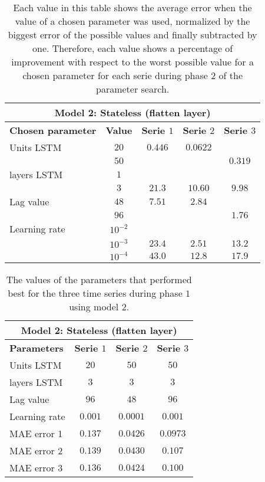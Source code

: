 \begin{table}[ht]
	\centering
	\begin{tabular}{@{}l||c|ccc@{}} \toprule
		\multicolumn{5}{c}{Model 2: Stateless (flatten layer)}\\\midrule\midrule
		\textbf{Chosen parameter}	& \textbf{Value} & \textbf{Serie $ 1 $} & \textbf{Serie $ 2 $} & \textbf{Serie $ 3 $}\\\midrule
		Units LSTM & $ 20 $ & $0.446 $&$ 0.0622 $  & \\
				   & $ 50 $  & 		  		&		   				& $0.319 $		\\\hline
		layers LSTM & $ 1 $ & 		&		   & 		\\
		            & $ 3 $ &  $21.3 $   	&$ 10.60 $  				& $9.98$\\\hline
		Lag value & $ 48 $ & $7.51 $&$ 2.84 $		   & \\
		            & $ 96 $ &          		& 		 & 	$1.76$	\\\hline
		Learning rate & $ 10^{-2} $ &       &		 & 		\\
		           & $  10^{-3} $ &$23.4 $    &$ 2.51$  			& $13.2$\\
		          & $  10^{-4} $ &$43.0 $		&$ 12.8$    	& $17.9$\\\bottomrule
		
	\end{tabular}
	\caption{Each value in this table shows the average error when the value of a chosen parameter was used, normalized by the biggest error of the possible values and finally subtracted by one. Therefore, each value shows a percentage of improvement with respect to the worst possible value for a chosen parameter for each serie during phase $ 2 $ of the parameter search.}
	\label{tab:relative_performance_parameters_phase_one_model_two}
\end{table}

\begin{table}[ht]
	\centering
	\begin{tabular}{@{}l|ccc@{}} \toprule
		\multicolumn{4}{c}{Model 2: Stateless (flatten layer)}\\\midrule\midrule
		\textbf{Parameters}	& \textbf{Serie $ 1 $} & \textbf{Serie $ 2 $} & \textbf{Serie $ 3 $}\\\midrule
		Units LSTM & $20 $&$ 50 $  & $50 $\\
		layers LSTM & $3 $&$ 3 $  & $3$\\
		Lag value & $96 $&$ 48$  & $96$\\
		Learning rate & $0.001 $&$ 0.0001$  & $0.001$\\\hline
		MAE error 1   & $ 0.137 $ & $ 0.0426 $ & $ 0.0973 $\\
		MAE error 2   & $ 0.139 $ & $ 0.0430 $ & $ 0.107 $\\
		MAE error 3   & $ 0.136 $ & $ 0.0424 $ & $ 0.100 $\\\bottomrule
	\end{tabular}
	\caption{The values of the parameters that performed best for the three time series during phase $ 1 $ using model $ 2 $.}
	\label{tab:best_performing_para_phase1}
\end{table}



